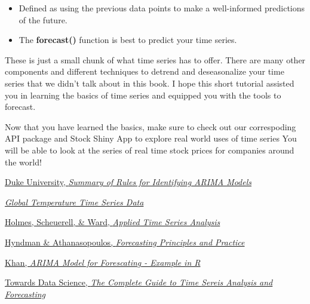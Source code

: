 \documentclass[
]{book}
\providecommand{\tightlist}{%
  \setlength{\itemsep}{0pt}\setlength{\parskip}{0pt}}
\begin{document}
\begin{itemize}
  \begin{itemize}
  \tightlist
  \item
    Defined as using the previous data points to make a well-informed predictions of the future.
  \item
    The \textbf{forecast()} function is best to predict your time series.
  \end{itemize}
\end{itemize}

These is just a small chunk of what time series has to offer. There are many other components and different techniques to detrend and deseasonalize your time series that we didn't talk about in this book. I hope this short tutorial assisted you in learning the basics of time series and equipped you with the tools to forecast.

Now that you have learned the basics, make sure to check out our correspoding API package and Stock Shiny App to explore real world uses of time series You will be able to look at the series of real time stock prices for companies around the world!

\href{https://people.duke.edu/~rnau/arimrule.htm}{Duke University, \emph{Summary of Rules for Identifying ARIMA Models}}

\href{https://datahub.io/core/global-temp}{\emph{Global Temperature Time Series Data}}

\href{https://nwfsc-timeseries.github.io/atsa-labs/}{Holmes, Scheuerell, \& Ward, \emph{Applied Time Series Analysis}}

\href{https://otexts.com/fpp2/}{Hyndman \& Athanasopoulos, \emph{Forecasting Principles and Practice}}

\href{https://rpubs.com/riazakhan94/arima_with_example}{Khan, \emph{ARIMA Model for Forescating - Example in R}}

\href{https://towardsdatascience.com/the-complete-guide-to-time-series-analysis-and-forecasting-70d476bfe775}{Towards Data Science, \emph{The Complete Guide to Time Sereis Analysis and Forecasting}}

  
\end{document}
